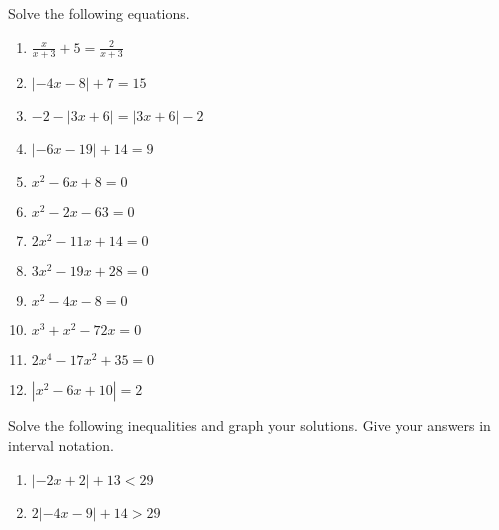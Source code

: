 \documentclass{article}
\begin{document}
\ReviewTitle[class={College Algebra}, for={Test 1}]

Solve the following equations.

\begin{enumerate}
\item $\displaystyle\frac{x}{x + 3} + 5 = \displaystyle\frac{2}{x + 3}$ \vspace{4cm}

\item $|-4x - 8| + 7 = 15$ \vspace{4cm}

\item $-2 - |3x + 6| = |3x + 6| - 2$ \vspace{4cm}

\item $|-6x - 19| + 14 = 9$ \vspace{4cm}

\newpage

\item $x^2 - 6x + 8 = 0$

   \vspace{4cm}

\item $x^2 - 2x - 63 = 0$

   \vspace{4cm}

\item $2x^2 - 11x + 14 = 0$

   \vspace{4cm}

\item $3x^2 - 19x + 28 = 0$

   \vspace{4cm}

\item 

$x^2 - 4x - 8 = 0$

   \vspace{4cm}

\newpage

\item $x^3 + x^2 - 72x = 0$

   \vspace{4cm}

\item $2x^4 - 17x^2 + 35 = 0$

   \vspace{4cm}

\item $|x^2 - 6x + 10| = 2$

   \vspace{4cm}
\end{enumerate}

Solve the following inequalities and graph your solutions. Give your answers in interval notation.

\begin{enumerate}
\item $|-2x + 2| + 13 < 29$ \vspace{4cm}

\item $2|-4x - 9| + 14 > 29$
\end{enumerate}
\end{document}
